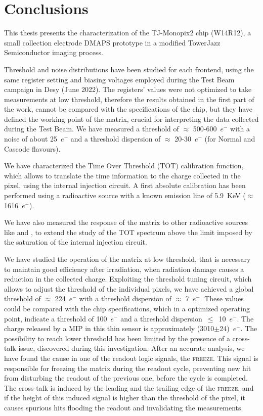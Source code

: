 
\chapter{Conclusions}

This thesis presents the characterization of the TJ-Monopix2 chip (W14R12), a small collection electrode DMAPS prototype in a modified TowerJazz Semiconductor imaging process.

Threshold and noise distributions have been studied for each frontend, using the same register setting and biasing voltages employed during the Test Beam campaign in Desy (June 2022).
The registers' values were not optimized to take measurements at low threshold, therefore the results obtained in the first part of the work, cannot be compared with the specifications of the chip, but they have defined the working point of the matrix, crucial for interpreting the data collected during the Test Beam. We have measured a threshold of $\approx$ 500-600~$e^{-}$ with a noise of about 25~$e^{-}$ and a threshold dispersion of $\approx$ 20-30~$e^{-}$ (for Normal and Cascode flavours).

We have characterized the Time Over Threshold (TOT) calibration function, which allows to translate the time information to the charge collected in the pixel, using the internal injection circuit. A first absolute calibration has been performed using a  radioactive source with a known emission line of \SI{5.9}{KeV} ($\approx$ 1616~$e^{-}$). 

We have also measured the response of the matrix to other radioactive sources like  and , to extend the study of the TOT spectrum above the limit imposed by the saturation of the internal injection circuit.

We have studied the operation of the matrix at low threshold, that is necessary to maintain good efficiency after irradiation, when radiation damage causes a reduction in the collected charge.
Exploiting the threshold tuning circuit, which allows to adjust the threshold of the individual pixels, we have achieved a global threshold of $\approx$ 224~$e^{-}$ with a threshold dispersion of $\approx$ 7~$e^{-}$. These values could be compared with the chip specifications, which in a optimized operating point, indicate a threshold of 100~$e^{-}$ and a threshold dispersion~$\le$~10~$e^{-}$. The charge released by a MIP in this thin sensor is approximately (3010$\pm$24)~$e^{-}$. The possibility to reach lower threshold has been limited by the presence of a cross-talk issue, discovered during this investigation.
After an accurate analysis, we have found the cause in one of the readout logic signals, the \textsc{freeze}. This signal is responsible for freezing the matrix during the readout cycle, preventing new hit from disturbing the readout of the previous one, before the cycle is completed. The cross-talk is induced by the leading and the trailing edge of the \textsc{freeze}, and if the height of this induced signal is higher than the threshold of the pixel, it causes spurious hits flooding the readout and invalidating the measurements.


